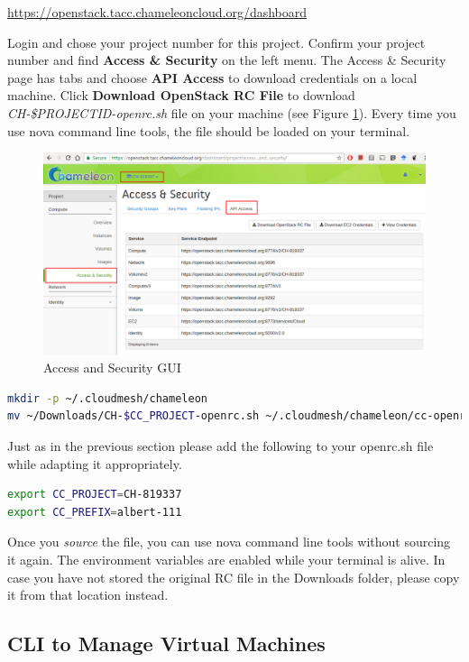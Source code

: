 \url{https://openstack.tacc.chameleoncloud.org/dashboard}

Login and chose your project number for this project.  Confirm your
project number and find \textbf{Access \& Security} on the left menu.
The Access \& Security page has tabs and choose \textbf{API Access} to
download credentials on a local machine. Click \textbf{Download
  OpenStack RC File} to download \textit{CH-\$PROJECTID-openrc.sh}
file on your machine (see Figure \ref{F:cc-gui}). Every time you use nova
command line tools, the file should be loaded on your terminal.


\begin{figure}[!htbp]
  \centering 
  \includegraphics[width=0.6\columnwidth]{section/cloud/chameleon/images/openstack-chameleon-openrc.png}
  \caption{Access and Security GUI}
  \label{F:cc-gui}
\end{figure}


\begin{lstlisting}[language=bash]
mkdir -p ~/.cloudmesh/chameleon
mv ~/Downloads/CH-$CC_PROJECT-openrc.sh ~/.cloudmesh/chameleon/cc-openrc.sh
\end{lstlisting}

Just as in the previous section please add the following to your
openrc.sh file while adapting it appropriately.

\begin{lstlisting}[language=bash]
export CC_PROJECT=CH-819337
export CC_PREFIX=albert-111
\end{lstlisting}

Once you \textit{source} the file, you can use nova command line tools
without sourcing it again.  The environment variables are enabled
while your terminal is alive. In case you have not stored the original
RC file in the Downloads folder, please copy it from that location
instead.

\subsection{CLI to Manage Virtual Machines}


